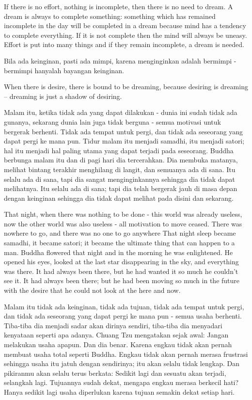\english
If there is no effort, nothing is incomplete, then there is no need to dream. A dream is always to complete something: something which has remained incomplete in the day will be completed in a dream because mind has a tendency to complete everything. If it is not complete then the mind will always be uneasy. Effort is put into many things and if they remain incomplete, a dream is needed.

\bahasa
Bila ada keinginan, pasti ada mimpi, karena menginginkan adalah bermimpi - bermimpi hanyalah bayangan keinginan.

\english
When there is desire, there is bound to be dreaming, because desiring is dreaming – dreaming is just a shadow of desiring.

\bahasa
Malam itu, ketika tidak ada yang dapat dilakukan - dunia ini sudah tidak ada gunanya, sekarang dunia lain juga tidak berguna - semua motivasi untuk bergerak berhenti. Tidak ada tempat untuk pergi, dan tidak ada seseorang yang dapat pergi ke mana pun. Tidur malam itu menjadi samadhi, itu menjadi satori; hal itu menjadi hal paling utama yang dapat terjadi pada seseorang. Buddha berbunga malam itu dan di pagi hari dia tercerahkan. Dia membuka matanya, melihat bintang terakhir menghilang di langit, dan semuanya ada di sana. Itu selalu ada di sana, tapi dia sangat menginginkannya sehingga dia tidak dapat melihatnya. Itu selalu ada di sana; tapi dia telah bergerak jauh di masa depan dengan keinginan sehingga dia tidak dapat melihat pada disini dan sekarang.

\english
That night, when there was nothing to be done - this world was already useless, now the other world was also useless - all motivation to move ceased. There was nowhere to go, and there was no one to go anywhere That night sleep became samadhi, it became satori; it became the ultimate thing that can happen to a man. Buddha flowered that night and in the morning he was enlightened. He opened his eyes, looked at the last star disappearing in the sky, and everything was there. It had always been there, but he had wanted it so much he couldn't see it. It had always been there; but he had been moving so much in the future with the desire that he could not look at the here and now.

\bahasa
Malam itu tidak ada keinginan, tidak ada tujuan, tidak ada tempat untuk pergi, dan tidak ada seseorang yang dapat pergi ke mana pun - semua usaha berhenti. Tiba-tiba dia menjadi sadar akan dirinya sendiri, tiba-tiba dia menyadari kenyataan seperti apa adanya. Chuang Tzu mengatakan sejak awal: Jangan melakukan usaha apapun. Dan dia benar. Karena engkau tidak akan pernah membuat usaha total seperti Buddha. Engkau tidak akan pernah merasa frustrasi sehingga usaha itu jatuh dengan sendirinya; itu akan selalu tidak lengkap. Dan pikiranmu akan selalu terus berkata: Sedikit lagi dan sesuatu akan terjadi, selangkah lagi. Tujuannya sudah dekat, mengapa engkau merasa berkecil hati? Hanya sedikit lagi usaha diperlukan karena tujuan semakin dekat setiap hari.

